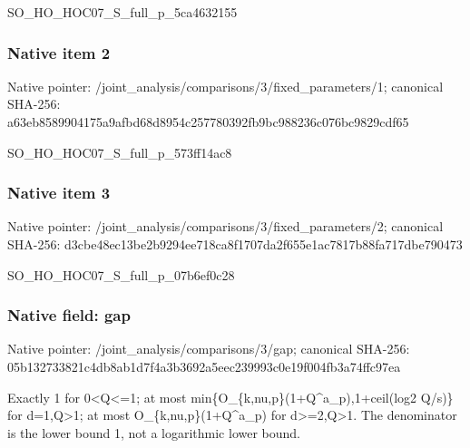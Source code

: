 \documentclass[10pt,a4paper]{article}
\begin{document}
\begingroup\raggedright\sloppy SO\_\allowbreak{}HO\_\allowbreak{}HOC07\_\allowbreak{}S\_\allowbreak{}full\_\allowbreak{}p\_\allowbreak{}5ca4632155\par\endgroup

\subsubsection{Native item 2}
Native pointer: /joint\_\allowbreak{}analysis/comparisons/3/fixed\_\allowbreak{}parameters/1; canonical SHA-256: a63eb8589904175a9afbd68d8954c257780392fb9bc988236c076bc9829cdf65

\begingroup\raggedright\sloppy SO\_\allowbreak{}HO\_\allowbreak{}HOC07\_\allowbreak{}S\_\allowbreak{}full\_\allowbreak{}p\_\allowbreak{}573ff14ac8\par\endgroup

\subsubsection{Native item 3}
Native pointer: /joint\_\allowbreak{}analysis/comparisons/3/fixed\_\allowbreak{}parameters/2; canonical SHA-256: d3cbe48ec13be2b9294ee718ca8f1707da2f655e1ac7817b88fa717dbe790473

\begingroup\raggedright\sloppy SO\_\allowbreak{}HO\_\allowbreak{}HOC07\_\allowbreak{}S\_\allowbreak{}full\_\allowbreak{}p\_\allowbreak{}07b6ef0c28\par\endgroup

\subsubsection{Native field: gap}
Native pointer: /joint\_\allowbreak{}analysis/comparisons/3/gap; canonical SHA-256: 05b132733821c4db8ab1d7f4a3b3692a5eec239993c0e19f004fb3a74ffc97ea

\begingroup\raggedright\sloppy Exactly 1 for 0<Q<=\allowbreak{}1;\allowbreak{} at most min\{O\_\allowbreak{}\{k,\allowbreak{}nu,\allowbreak{}p\}(1+Q\textasciicircum{}a\_\allowbreak{}p),\allowbreak{}1+ceil(log2 Q/\allowbreak{}s)\} for d=\allowbreak{}1,\allowbreak{}Q>1;\allowbreak{} at most O\_\allowbreak{}\{k,\allowbreak{}nu,\allowbreak{}p\}(1+Q\textasciicircum{}a\_\allowbreak{}p) for d>=\allowbreak{}2,\allowbreak{}Q>1. The denominator is the lower bound 1,\allowbreak{} not a logarithmic lower bound.\par\endgroup
\end{document}

